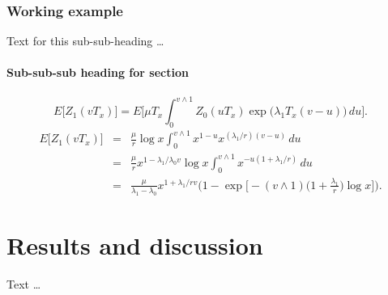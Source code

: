 \documentclass{bmcart}
\begin{document}
\subsubsection*{Working example}
Text for this sub-sub-heading \ldots
\paragraph*{Sub-sub-sub heading for section}
%
\[
 E \bigl[Z_1(vT_x) \bigr]= E
\biggl[\mu T_x\int_0^{v\wedge
1}Z_0(uT_x)
\exp \bigl(\lambda_1T_x(v-u) \bigr)\,du \biggr].
\]
%
\begin{eqnarray}\label{eqexpmuts}
E\bigl[Z_1(vT_x)\bigr] &=& \frac{\mu}{r}\log x
\int_0^{v\wedge1}x^{1-u}x^{({\lambda_1}/{r})(v-u)}\,du
\nonumber\\
&=& \frac{\mu}{r}x^{1-{\lambda_1}/{\lambda_0}v}\log x\int_0^{v\wedge
1}x^{-u(1+{\lambda_1}/{r})}\,du
\nonumber\\
&=& \frac{\mu}{\lambda_1-\lambda_0}x^{1+{\lambda_1}/{r}v} \biggl(1-\exp \biggl[-(v\wedge1) \biggl(1+
\frac{\lambda_1}{r}\biggr)\log x \biggr] \biggr).
\end{eqnarray}

\section*{Results and discussion}
Text \ldots

\end{document}
